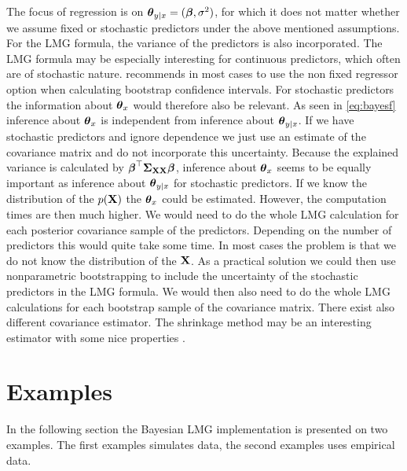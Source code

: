 \documentclass[11pt,a4paper,twoside]{book}\usepackage[]{graphicx}\usepackage[]{color}
\begin{document}
  The focus of regression is on ${\boldsymbol{\theta}}{}_{y \mid x} = ({\boldsymbol{\beta}}, \sigma^2)$, for which it does not matter whether we assume fixed or stochastic predictors under the above mentioned assumptions. For the LMG formula, the variance of the predictors is also incorporated. The LMG formula may be especially interesting for continuous predictors, which often are of stochastic nature. \cite{Gromping2006} recommends in most cases to use the non fixed regressor option when calculating bootstrap confidence intervals. For stochastic predictors the information about ${\boldsymbol{\theta}}{}_{x}$ would therefore also be relevant.  As seen in \eqref{eq:bayesf} inference about ${\boldsymbol{\theta}}{}_{x}$  is independent from inference about ${\boldsymbol{\theta}}{}_{y \mid x}$. If we have stochastic predictors and ignore dependence we just use an estimate of the covariance matrix and do not incorporate this uncertainty.  Because the explained variance is calculated by ${\boldsymbol{\beta}}^\top {\boldsymbol{\Sigma}}{}_{{\mathbf{X}} {\mathbf{X}}}  {\boldsymbol{\beta}}$, inference about  ${\boldsymbol{\theta}}{}_{x}$  seems to be equally important as inference about ${\boldsymbol{\theta}}{}_{y \mid x}$ for stochastic predictors. If we know the distribution of the $p({\mathbf{X}})$ the ${\boldsymbol{\theta}}{}_{x}$ could be estimated. However, the computation times are then much higher. We would need to do the whole LMG calculation for each posterior covariance sample of the predictors. Depending on the number of predictors this would quite take some time.  In most cases the problem is that we do not know the distribution of the ${\mathbf{X}}$. As a practical solution we could then use nonparametric bootstrapping to include the uncertainty of the stochastic predictors in the LMG formula. We would then also need to do the whole LMG calculations for each bootstrap sample of the covariance matrix. There exist also different covariance estimator. The shrinkage method may be an interesting estimator with some nice properties \citep{Schafer2005}. 
  
  
  
 









\chapter{Examples}

In the following section the Bayesian LMG implementation is presented on two examples. The first examples simulates data, the second examples uses empirical data.
\end{document}
